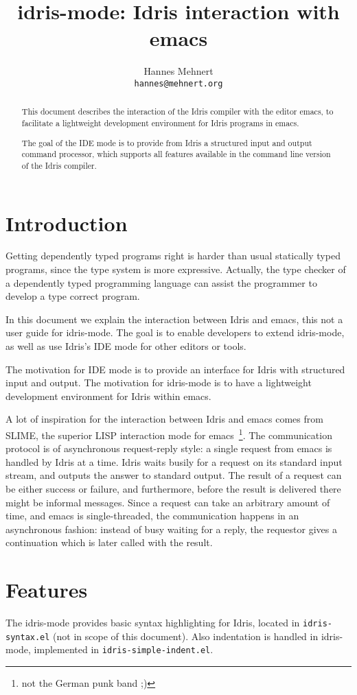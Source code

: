 \documentclass{article}
\title{idris-mode: Idris interaction with emacs}
\author{Hannes Mehnert\\\texttt{hannes@mehnert.org}}
\begin{document}
\sloppy
\maketitle

\begin{abstract}
This document describes the interaction of the Idris compiler with the editor emacs, to facilitate a lightweight development environment for Idris programs in emacs.

The goal of the IDE mode is to provide from Idris a structured input and output command processor, which supports all features available in the command line version of the Idris compiler.
\end{abstract}

\section{Introduction}
Getting dependently typed programs right is harder than usual statically typed programs, since the type system is more expressive.
Actually, the type checker of a dependently typed programming language can assist the programmer to develop a type correct program.

In this document we explain the interaction between Idris and emacs, this not a user guide for idris-mode.
The goal is to enable developers to extend idris-mode, as well as use Idris's IDE mode for other editors or tools.

The motivation for IDE mode is to provide an interface for Idris with structured input and output.
The motivation for idris-mode is to have a lightweight development environment for Idris within emacs.

A lot of inspiration for the interaction between Idris and emacs comes from SLIME, the superior LISP interaction mode for emacs~\footnote{not the German punk band ;)}.
The communication protocol is of asynchronous request-reply style: a single request from emacs is handled by Idris at a time.
Idris waits busily for a request on its standard input stream, and outputs the answer to standard output.
The result of a request can be either success or failure, and furthermore, before the result is delivered there might be informal messages.
Since a request can take an arbitrary amount of time, and emacs is single-threaded, the communication happens in an asynchronous fashion: instead of busy waiting for a reply, the requestor gives a continuation which is later called with the result.

\section{Features}
The idris-mode provides basic syntax highlighting for Idris, located in \texttt{idris-syntax.el} (not in scope of this document).
Also indentation is handled in idris-mode, implemented in \texttt{idris-simple-indent.el}.
\end{document}
